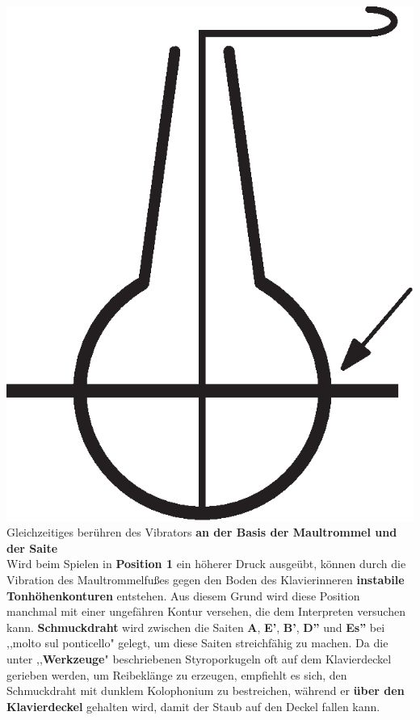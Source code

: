 \documentclass[12pt]{article}
\newcommand*\circled[1]{\tikz[baseline=(char.base)]{
            \node[shape=circle,draw,inner sep=1pt] (char) {#1};}}
\begin{document}
\includegraphics[scale=0.2]{string.eps}
\circled{3} Gleichzeitiges berühren des Vibrators \textbf{an der Basis der Maultrommel und der Saite} \\

Wird beim Spielen in \textbf{Position 1} ein höherer Druck ausgeübt, können durch die Vibration des Maultrommelfußes gegen den Boden des Klavierinneren \textbf{instabile Tonhöhenkonturen} entstehen. Aus diesem Grund wird diese Position manchmal mit einer ungefähren Kontur versehen, die dem Interpreten versuchen kann. \textbf{\circled{4} Schmuckdraht} wird zwischen die Saiten \textbf{A}, \textbf{E'}, \textbf{B'}, \textbf{D''} und \textbf{Es''} bei ,,molto sul ponticello" gelegt, um diese Saiten streichfähig zu machen. Da die unter ,,\textbf{Werkzeuge}" beschriebenen Styroporkugeln oft auf dem Klavierdeckel gerieben werden, um Reibeklänge zu erzeugen, empfiehlt es sich, den Schmuckdraht mit dunklem Kolophonium zu bestreichen, während er \textbf{über den Klavierdeckel} gehalten wird, damit der Staub auf den Deckel fallen kann.
\endgroup
\end{document}
